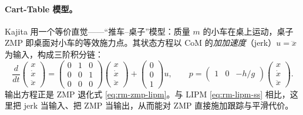\paragraph{Cart-Table 模型。}
Kajita 用一个等价直觉——“推车–桌子”模型：质量 $m$ 的小车在桌上运动，桌子 ZMP 即桌面对小车的等效施力点。其状态方程以 CoM 的\emph{加加速度}（jerk）$u=\dddot{x}$ 为输入，构成三阶积分链：
\begin{equation}
  \frac{d}{dt}\begin{pmatrix}x\\\dot{x}\\\ddot{x}\end{pmatrix}
  =\begin{pmatrix}0&1&0\\0&0&1\\0&0&0\end{pmatrix}\begin{pmatrix}x\\\dot{x}\\\ddot{x}\end{pmatrix}
  +\begin{pmatrix}0\\0\\1\end{pmatrix}u,\qquad
  p=\begin{pmatrix}1&0&-h/g\end{pmatrix}\begin{pmatrix}x\\\dot{x}\\\ddot{x}\end{pmatrix}.
  \label{eq:rm-carttable}
\end{equation}
输出方程正是 ZMP 退化式 \cref{eq:rm-zmp-lipm}。与 LIPM \cref{eq:rm-lipm-ss} 相比，这里把 jerk 当输入、把 ZMP 当输出，从而能对 ZMP 直接施加跟踪与平滑代价。

